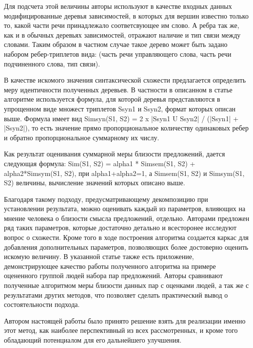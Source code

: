 Для подсчета этой величины авторы используют в качестве входных данных
модифицированные деревья зависимостей, в которых для вершин известно только то, 
какой части речи принадлежало соответсвующее им слово.
А ребра так же, как и в обычных деревьях зависимостей, отражают
наличие и тип связи между словами.
Таким образом в частном случае такое дерево может быть задано
набором ребер-триплетов вида:
(часть речи управляющего слова, часть речи подчиненного слова, тип связи).

В качестве искомого значения синтаксической схожести предлагается определить меру идентичности
полученных деревьев. В частности в описанном в статье алгоритме
используется формула, для которой деревья представляются в упрощенном виде
множест триплетов Ssyn1 и Ssyn2, формат которых описан выше.
Формула имеет вид Simsyn(S1, S2) = 2 x |Ssyn1 U Ssyn2| / (|Ssyn1| + |Ssyn2|), 
то есть значение прямо пропорциональное количеству одинаковых ребер
и обратно пропорциональное суммарному их числу.


Как результат оценивания суммарной меры близости предложений, 
дается следующая формула:
Sim(S1, S2) = alpha1 * Simsem(S1, S2) + alpha2*Simsym(S1, S2), при alpha1+alpha2=1,
а Simsem(S1, S2) и Simsym(S1, S2) величины, вычисление значений которых
описано выше.

Благодаря такому подходу, предусматривающему декомпозицию при установлении результата, 
можно оценивать каждый из параметров, влияющих на мнение человека о близости
смысла предложений, отдельно. Авторами предложен ряд таких параметров, 
которые достаточно детально и всесторонее исследуют вопрос о схожести. Кроме того
в ходе построения алгоритма создается каркас для добавления дополнительных параметров,
позволяющих более достоверно оценить искомую величину. 
В указанной статье также есть приложение, демонстрирующее качество работы
полученного алгоритма на примере оцененного группой людей набора пар предложений.
Авторы сравнивают полученные алгоритмом меры близости данных пар с оценками людей, 
а так же с результатами других методов, что позволяет сделать практический вывод
о состоятельности подхода.

Автором настоящей работы было принято решение взять для реализации именно этот метод,
как наиболее перспективный из всех рассмотренных, и кроме того обладающий
потенциалом для его дальнейшего улучшения.

